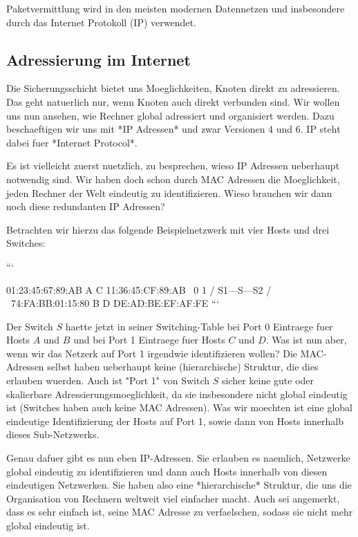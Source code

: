 Paketvermittlung wird in den meisten modernen Datennetzen und insbesondere durch
das Internet Protokoll (IP) verwendet.

\subsection{Adressierung im Internet} 

Die Sicherungsschicht bietet uns Moeglichkeiten, Knoten direkt zu
adressieren. Das geht natuerlich nur, wenn Knoten auch direkt verbunden
sind. Wir wollen uns nun ansehen, wie Rechner global adressiert und organisiert
werden. Dazu beschaeftigen wir uns mit *IP Adressen* und zwar Versionen 4
und 6. IP steht dabei fuer *Internet Protocol*.

Es ist vielleicht zuerst nuetzlich, zu besprechen, wieso IP Adressen ueberhaupt
notwendig sind. Wir haben doch schon durch MAC Adressen die Moeglichkeit, jeden
Rechner der Welt eindeutig zu identifizieren. Wieso brauchen wir dann noch diese
redundanten IP Adressen?

Betrachten wir hierzu das folgende Beispielnetzwerk mit vier Hosts und drei Switches:

```

01:23:45:67:89:AB A           C 11:36:45:CF:89:AB
                   \   0 1   /
                   S1---S---S2
                   /         \
74:FA:BB:01:15:80 B           D DE:AD:BE:EF:AF:FE
```

Der Switch $S$ haette jetzt in seiner Switching-Table bei Port 0 Eintraege fuer
Hosts $A$ und $B$ und bei Port 1 Eintraege fuer Hosts $C$ und $D$. Was ist nun
aber, wenn wir das Netzerk auf Port 1 irgendwie identifizieren wollen? Die
MAC-Adressen selbst haben ueberhaupt keine (hierarchische) Struktur, die dies
erlauben wuerden. Auch ist "Port 1" von Switch $S$ sicher keine gute oder
skalierbare Adressierungsmoeglichkeit, da sie insbesondere nicht global
eindeutig ist (Switches haben auch keine MAC Adressen). Was wir moechten ist
eine global eindeutige Identifizierung der Hosts auf Port 1, sowie dann von
Hosts innerhalb dieses Sub-Netzwerks.

Genau dafuer gibt es nun eben IP-Adressen. Sie erlauben es naemlich, Netzwerke
global eindeutig zu identifizieren und dann auch Hosts innerhalb von diesen
eindeutigen Netzwerken. Sie haben also eine *hierarchische* Struktur, die uns
die Organisation von Rechnern weltweit viel einfacher macht. Auch sei angemerkt,
dass es sehr einfach ist, seine MAC Adresse zu verfaelschen, sodass sie nicht
mehr global eindeutig ist.

